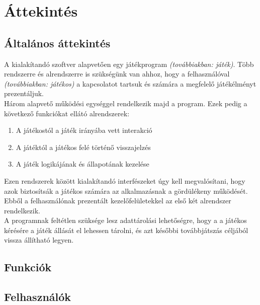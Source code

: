 \section{Áttekintés}

\subsection{Általános áttekintés}

\indent A kialakítandó szoftver alapvetően egy játékprogram \emph{(továbbiakban: játék)}. Több rendszerre és alrendszerre is szükségünk van ahhoz, hogy a felhasználóval \emph{(továbbiakban: játékos)} a kapcsolatot tartsuk és számára a megfelelő játékélményt prezentáljuk.\\
\indent Három alapvető működési egységgel rendelkezik majd a program. Ezek pedig a következő funkciókat ellátó alrendszerek:
\begin{enumerate}
	\setlength\itemsep{0pt}
	\item A játékostól a játék irányába vett interakció
	\item A játéktól a játékos felé történő visszajelzés 
	\item A játék logikájának és állapotának kezelése
\end{enumerate}
Ezen rendszerek között kialakítandó interfészeket úgy kell megvalósítani, hogy azok biztosítsák a játékos számára az alkalmazásnak a gördülékeny működését. Ebből a felhasználónak prezentált kezelőfelületekkel az első két alrendszer rendelkezik.\\
\indent A programnak feltétlen szüksége lesz adattárolási lehetőségre, hogy a a játékos kérésére a játék állását el lehessen tárolni, és azt későbbi továbbjátszás céljából vissza állítható legyen.

\subsection{Funkciók}

\subsection{Felhasználók}


